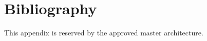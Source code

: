 \chapter{Bibliography}
\label{app:bibliography}

This appendix is reserved by the approved master architecture.
